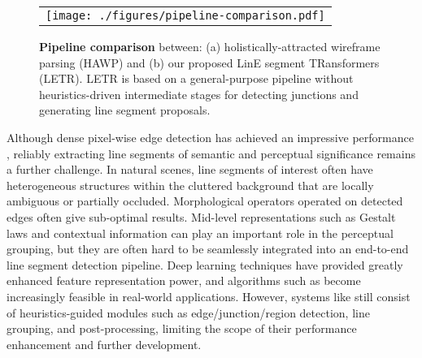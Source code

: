 \documentclass[final]{cvpr}
\begin{document}
\begin{figure}[!htp]
\centering
\label{fig:pipeline-comparison}
\begin{tabular} {c}
\hspace{-1mm}\texttt{[image: ./figures/pipeline-comparison.pdf]}
\end{tabular}
\caption{\footnotesize \textbf{Pipeline comparison} between: (a) holistically-attracted wireframe parsing (HAWP) \cite{xue2020holistically} and (b) our proposed LinE segment TRansformers (LETR). LETR is based on a general-purpose pipeline without heuristics-driven intermediate stages for detecting junctions and generating line segment proposals.}
\vspace{-5mm}
\end{figure}

Although dense pixel-wise edge detection has achieved an impressive performance \cite{xie2015holistically}, reliably extracting line segments of semantic and perceptual significance remains a further challenge. In natural scenes, line segments of interest often have heterogeneous structures within the cluttered background that are locally ambiguous or partially occluded. Morphological operators \cite{smith1997susan} operated on detected edges \cite{canny1986computational} often give sub-optimal results. Mid-level representations such as Gestalt laws \cite{elder2002ecological} and contextual information \cite{tu2008auto} can play an important role in the perceptual grouping, but they are often hard to be seamlessly integrated into an end-to-end line segment detection pipeline. Deep learning techniques \cite{krizhevsky2012imagenet,long2015fully,he2016deep,xie2015holistically} have provided greatly enhanced feature representation power, and algorithms such as \cite{zhou2019end,xue2019learning,xue2020holistically} become increasingly feasible in real-world applications.
However, systems like \cite{zhou2019end,xue2019learning,xue2020holistically} still consist of heuristics-guided modules \cite{smith1997susan} such as edge/junction/region detection, line grouping, and post-processing, limiting the scope of their performance enhancement and further development.
\end{document}
